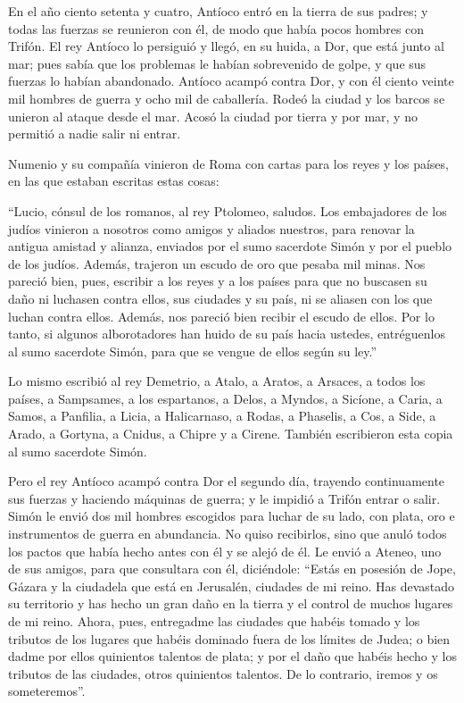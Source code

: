  En el año ciento setenta y cuatro, Antíoco entró en la
tierra de sus padres; y todas las fuerzas se reunieron con él, de modo
que había pocos hombres con Trifón.  El rey Antíoco lo
persiguió y llegó, en su huida, a Dor, que está junto al mar;
 pues sabía que los problemas le habían sobrevenido de
golpe, y que sus fuerzas lo habían abandonado.  Antíoco
acampó contra Dor, y con él ciento veinte mil hombres de guerra y ocho
mil de caballería.  Rodeó la ciudad y los barcos se
unieron al ataque desde el mar. Acosó la ciudad por tierra y por mar, y
no permitió a nadie salir ni entrar.

 Numenio y su compañía vinieron de Roma con cartas para
los reyes y los países, en las que estaban escritas estas cosas:

 ``Lucio, cónsul de los romanos, al rey Ptolomeo,
saludos.  Los embajadores de los judíos vinieron a
nosotros como amigos y aliados nuestros, para renovar la antigua amistad
y alianza, enviados por el sumo sacerdote Simón y por el pueblo de los
judíos.  Además, trajeron un escudo de oro que pesaba mil
minas.  Nos pareció bien, pues, escribir a los reyes y a
los países para que no buscasen su daño ni luchasen contra ellos, sus
ciudades y su país, ni se aliasen con los que luchan contra ellos.
 Además, nos pareció bien recibir el escudo de ellos.
 Por lo tanto, si algunos alborotadores han huido de su
país hacia ustedes, entréguenlos al sumo sacerdote Simón, para que se
vengue de ellos según su ley.''

 Lo mismo escribió al rey Demetrio, a Atalo, a Aratos, a
Arsaces,  a todos los países, a Sampsames, a los
espartanos, a Delos, a Myndos, a Sicíone, a Caria, a Samos, a Panfilia,
a Licia, a Halicarnaso, a Rodas, a Phaselis, a Cos, a Side, a Arado, a
Gortyna, a Cnidus, a Chipre y a Cirene.  También
escribieron esta copia al sumo sacerdote Simón.

 Pero el rey Antíoco acampó contra Dor el segundo día,
trayendo continuamente sus fuerzas y haciendo máquinas de guerra; y le
impidió a Trifón entrar o salir.  Simón le envió dos mil
hombres escogidos para luchar de su lado, con plata, oro e instrumentos
de guerra en abundancia.  No quiso recibirlos, sino que
anuló todos los pactos que había hecho antes con él y se alejó de él.
 Le envió a Ateneo, uno de sus amigos, para que
consultara con él, diciéndole: ``Estás en posesión de Jope, Gázara y la
ciudadela que está en Jerusalén, ciudades de mi reino. 
Has devastado su territorio y has hecho un gran daño en la tierra y el
control de muchos lugares de mi reino.  Ahora, pues,
entregadme las ciudades que habéis tomado y los tributos de los lugares
que habéis dominado fuera de los límites de Judea;  o
bien dadme por ellos quinientos talentos de plata; y por el daño que
habéis hecho y los tributos de las ciudades, otros quinientos talentos.
De lo contrario, iremos y os someteremos''.

